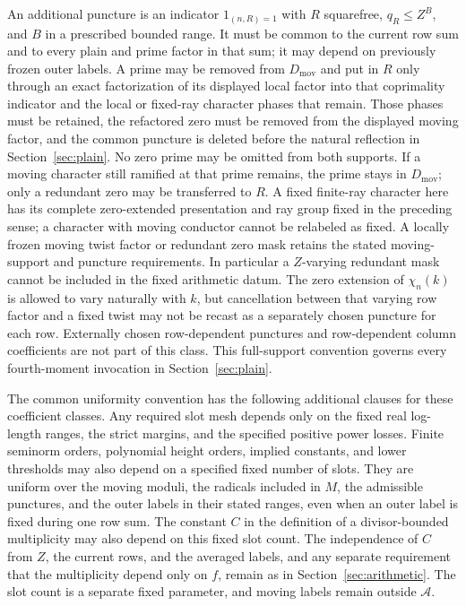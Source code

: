 \documentclass[11pt,a4paper]{article}
\numberwithin{equation}{section}
\numberwithin{figure}{section}
\theoremstyle{definition}
\theoremstyle{remark}
\begin{document}
An additional puncture is an indicator $1_{(n,R)=1}$ with $R$ squarefree,
$q_R\le Z^B$, and $B$ in a prescribed bounded range.  It must be common to
the current row sum and to every plain and prime factor in that sum; it may
depend on previously frozen outer labels.  A prime may be removed from
$D_{\mathrm{mov}}$ and put in $R$ only through an exact factorization of its
displayed local factor into that coprimality indicator and the local or
fixed-ray character phases that remain.  Those phases must be retained, the
refactored zero must be removed from the displayed moving factor, and the
common puncture is deleted before the natural reflection in
Section~\ref{sec:plain}.  No zero prime may be omitted from both supports.
If a moving character still ramified at that prime remains, the prime stays
in $D_{\mathrm{mov}}$; only a redundant zero may be transferred to $R$.
A fixed finite-ray character here has its complete zero-extended presentation
and ray group fixed in the preceding sense; a character with moving conductor
cannot be relabeled as fixed.  A locally frozen moving twist factor or
redundant zero mask retains the stated moving-support and puncture
requirements.  In particular a $Z$-varying redundant mask cannot be included
in the fixed arithmetic datum.  The zero extension of $\chi_n(k)$ is allowed
to vary naturally with $k$, but cancellation between that varying row factor
and a fixed twist may not be recast as a separately chosen puncture for each row.  Externally
chosen row-dependent punctures and row-dependent column coefficients are
not part of this class.  This full-support convention governs every
fourth-moment invocation in Section~\ref{sec:plain}.

The common uniformity convention has the following additional clauses for
these coefficient classes.  Any required slot mesh depends only on the fixed
real log-length ranges, the strict margins, and the specified positive power
losses.  Finite seminorm orders, polynomial height orders, implied constants,
and lower thresholds may also depend on a specified fixed number of slots.
They are uniform over the moving moduli, the radicals included in $M$, the
admissible punctures, and the outer labels in their stated ranges, even when
an outer label is fixed during one row sum.  The constant $C$ in the definition
of a divisor-bounded multiplicity may also depend on this fixed slot count.
The independence of $C$ from $Z$, the current rows, and the averaged labels,
and any separate requirement that the multiplicity depend only on $f$, remain
as in Section~\ref{sec:arithmetic}.  The slot count is a separate fixed
parameter, and moving labels remain outside $\mathcal A$.
\end{document}
